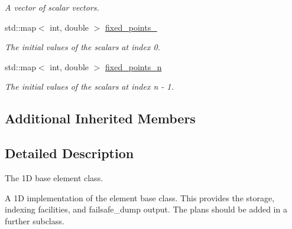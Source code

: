\begin{DoxyCompactItemize}
\begin{DoxyCompactList}\small\item\em A vector of scalar vectors. \end{DoxyCompactList}\item 
\hypertarget{classone__d_1_1element_a9f3230a0f72c358b6d2188645cb4058f}{std\-::map$<$ int, double $>$ \hyperlink{classone__d_1_1element_a9f3230a0f72c358b6d2188645cb4058f}{fixed\-\_\-points\-\_}}\label{classone__d_1_1element_a9f3230a0f72c358b6d2188645cb4058f}

\begin{DoxyCompactList}\small\item\em The initial values of the scalars at index 0. \end{DoxyCompactList}\item 
\hypertarget{classone__d_1_1element_a0b44d23843f57cd3c924e07816685bad}{std\-::map$<$ int, double $>$ \hyperlink{classone__d_1_1element_a0b44d23843f57cd3c924e07816685bad}{fixed\-\_\-points\-\_\-n}}\label{classone__d_1_1element_a0b44d23843f57cd3c924e07816685bad}

\begin{DoxyCompactList}\small\item\em The initial values of the scalars at index n -\/ 1. \end{DoxyCompactList}\end{DoxyCompactItemize}
\subsection*{Additional Inherited Members}


\subsection{Detailed Description}
The 1\-D base element class. 



 A 1\-D implementation of the element base class. This provides the storage, indexing facilities, and failsafe\-\_\-dump output. The plans should be added in a further subclass. 

